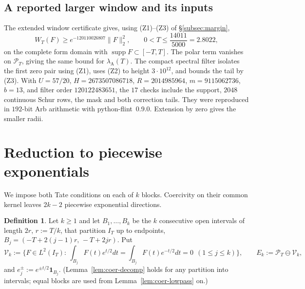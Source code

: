 \documentclass[10pt]{amsart}
\theoremstyle{definition}
\newtheorem{definition}[theorem]{Definition}
\theoremstyle{remark}
\newcommand{\supp}{\operatorname{supp}}
\newcommand{\PT}{\mathcal P_T}
\newcommand{\IT}{I_T}
\newcommand{\lamA}{\lambda_{\mathrm A}(T)}
\begin{document}
\subsection{A reported larger window and its inputs}\label{subsec:power-window}
The extended window certificate gives, using (Z1)--(Z3) of \S\ref{subsec:margin},
\begin{equation}\label{eq:power-window}
 W_T(F)\ge e^{-120110026807}\|F\|_2^2,
 \qquad 0<T\le\frac{14011}{5000}=2.8022,
\end{equation}
on the complete form domain with $\supp F\subset[-T,T]$.
The polar term vanishes on $\PT$, giving the same bound for $\lamA$.
The compact spectral filter isolates the first zero pair using (Z1),
uses (Z2) to height $3\cdot10^{12}$, and bounds the tail by (Z3).
With $U=57/20$, $H=2673507086718$, $R=2014985964$, $m=9115062736$,
$b=13$, and filter order $120122483651$, the $17$ checks include the
support, $2048$ continuous Schur rows, the mask and both correction tails.
They were reproduced in $192$-bit Arb arithmetic with python-flint~0.9.0.
Extension by zero gives the smaller radii.

\section{Reduction to piecewise exponentials}\label{sec:coer}

We impose both Tate conditions on each of $k$ blocks. Coercivity on
their common kernel leaves $2k-2$ piecewise exponential directions.

\begin{definition}\label{def:coer-V}
Let $k\ge1$ and let $B_1,\dots,B_k$ be the $k$ consecutive open intervals of length $2r$,
$r:=T/k$, that partition $\IT$ up to endpoints, $B_j=(-T+2(j-1)r,\,-T+2jr)$. Put
\[
\mathcal V_k:=\Big\{F\in L^2(\IT):\ \int_{B_j}F(t)e^{t/2}dt=\int_{B_j}F(t)e^{-t/2}dt=0\ \ (1\le j\le k)\Big\},
\qquad E_k:=\PT\ominus\mathcal V_k ,
\]
and $e_j^\pm:=e^{\pm t/2}\mathbf 1_{B_j}$. (Lemma~\ref{lem:coer-decomp} holds for any partition into
intervals; equal blocks are used from Lemma~\ref{lem:coer-lowpass} on.)
\end{definition}
\end{document}
